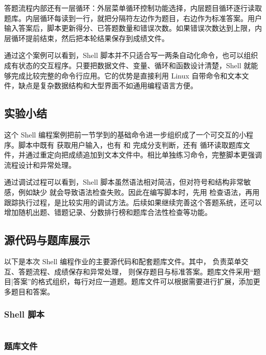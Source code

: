 答题流程内部还有一层循环：外层菜单循环控制功能选择，内层题目循环逐行读取题库。内层循环每读到一行，就把分隔符左边作为题目，右边作为标准答案。用户输入答案后，脚本更新得分、已答题数量和错误次数。如果错误次数达到上限，内层循环提前结束，然后把本轮结果保存到成绩文件。


通过这个案例可以看到，Shell 脚本并不只适合写一两条自动化命令，也可以组织成有状态的交互程序。只要把数据文件、变量、循环和函数设计清楚，Shell 就能够完成比较完整的命令行应用。它的优势是直接利用 Linux 自带命令和文本文件，缺点是复杂数据结构和大型界面不如通用编程语言方便。

\subsection{实验小结}

这个 Shell 编程案例把前一节学到的基础命令进一步组织成了一个可交互的小程序。脚本中既有  获取用户输入，也有  和  完成分支判断，还有  循环读取题库文件，并通过重定向把成绩追加到文本文件中。相比单独练习命令，完整脚本更强调流程设计和异常处理。

通过调试过程可以看到，Shell 脚本虽然语法相对简洁，但对符号和结构非常敏感，例如缺少  就会导致语法检查失败。因此在编写脚本时，先用  检查语法，再用  跟踪执行过程，是比较实用的调试方法。后续如果继续完善这个答题系统，还可以增加随机出题、错题记录、分数排行榜和题库合法性检查等功能。

\subsection{源代码与题库展示}

以下是本次 Shell 编程作业的主要源代码和配套题库文件。其中， 负责菜单交互、答题流程、成绩保存和异常处理， 则保存题目与标准答案。题库文件采用“题目|答案”的格式组织，每行对应一道题。题库文件可以根据需要进行扩展，添加更多题目和答案。

\subsubsection{Shell 脚本}

\inputminted{bash}{code/task2/linux_quiz.sh}

\subsubsection{题库文件}

\inputminted{text}{code/task2/questions.txt}


